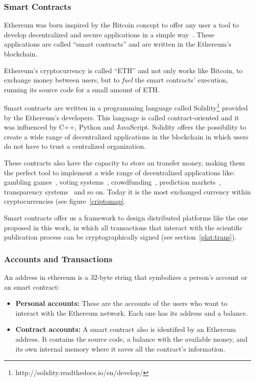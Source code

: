 \subsubsection*{Smart Contracts}
\label{tb:cryptos:sm}

Ethereum was born inspired by the Bitcoin concept to offer any user a tool to
develop decentralized and secure applications in a simple
way~\cite{buterin2014ethereum}. These applications are called ``smart
contracts'' and are written in the Ethereum's blockchain.

Ethereum's cryptocurrency is called ``ETH'' and not only works like Bitcoin, to
exchange money between users, but to \emph{fuel} the smart contracts' execution,
running its source code for a small amount of ETH.

Smart contracts are written in a programming language called
Solidity\footnote{http://solidity.readthedocs.io/en/develop/} provided by the
Ethereum's developers. This language is called contract-oriented and it was
influenced by C++, Python and JavaScript. Solidity offers the possibility to
create a wide range of decentralized applications in the blockchain in which
users do not have to trust a centralized organization.

These contracts also have the capacity to store an transfer money, making them
the perfect tool to implement a wide range of decentralized applications like:
gambling games~\cite{piasecki2016gaming}, voting
systems~\cite{mccorry2017smart}, crowdfunding~\cite{jacynycz2016betfunding},
prediction markets~\cite{peterson2015augur}, transparency
systems~\cite{bonneau2016ethiks} and so on. Today it is the most exchanged
currency within cryptocurrencies (see figure~\ref{criptomap}.

Smart contracts offer us a framework to design distributed platforms like the
one proposed in this work, in which all transactions that interact with the
scientific publication process can be cryptographically signed (see
section~\ref{plat:trans}).

\subsubsection*{Accounts and Transactions}
An address in ethereum is a 32-byte string that symbolizes a person's account or
an smart contract:
\begin{itemize}
\item \textbf{Personal accounts:} These are the accounts of the users who want
  to interact with the Ethereum network. Each one has its address and a balance.
\item \textbf{Contract accounts:} A smart contract also is identified by an
  Ethereum address. It contains the source code, a balance with the available
  money, and its own internal memory where it saves all the contract's
  information.
\end{itemize}

